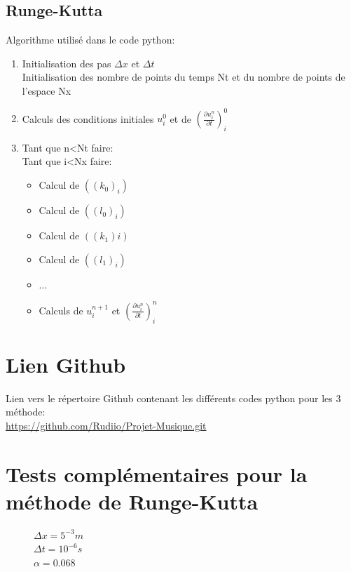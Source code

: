 \subsection{Runge-Kutta}
Algorithme utilisé dans le code python:
\begin{enumerate}
    \item Initialisation des pas $\Delta x$ et $\Delta t$\\
    Initialisation des nombre de points du temps Nt et du nombre de points de l'espace Nx
    
    \item Calculs des conditions initiales $u^0_{i}$ et de $(\frac{\partial u^n_{i}}{\partial t})^0_{i}$
    
    \item Tant que n<Nt faire:\\
     Tant que i<Nx faire:
        \begin{itemize}
            \item Calcul de $((k_0)_{i})$
            \item Calcul de $((l_0)_{i})$
            \item Calcul de $((k_1){i})$
            \item Calcul de $((l_1)_{i})$
            \item ...
            \item Calculs de $u^{n+1}_{i}$ et $(\frac{\partial u^n_{i}}{\partial t})^n_{i}$
        \end{itemize}
    
\end{enumerate}

\section{Lien Github}
Lien vers le répertoire Github contenant les différents codes python pour les 3 méthode:\\
\url{https://github.com/Rudiio/Projet-Musique.git}

\section{Tests complémentaires pour la méthode de Runge-Kutta}
\begin{figure}[H]
\begin{minipage}[b]{.46\linewidth}
\centering{}
\caption{
        $\Delta x= 5^{-2}m $\\
        $\Delta t= 10^{-7}s$\\
        $\alpha = 6.8.10^{-4}$
    \label{fig1}
    }
\end{minipage} \hfill
\begin{minipage}[b]{.46\linewidth}
\centering{}
\caption{$\Delta x= 5^{-3}m $\\ 
        $\Delta t= 10^{-6}s$\\
        $\alpha = 0.068$
        \label{fig2}}
\end{minipage}
\end{figure}

